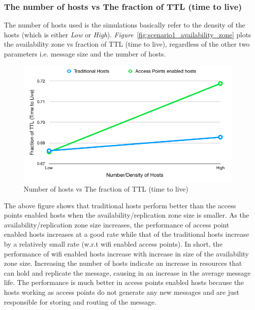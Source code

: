 {\subsubsection{The number of hosts vs The fraction of TTL (time to live)}
The number of hosts used is the simulations basically refer to the density of the hosts (which is either \textit{Low} or \textit{High}). \emph{Figure}~\ref{fig:scenario1_availability_zone} plots the availability zone vs fraction of TTL (time to live), regardless of the other two parameters i.e. message size and the number of hosts.
\begin{figure}[H]
  \centering
  \includegraphics[scale=0.45]{./figures/scenario1_hosts_count}
  \caption{Number of hosts vs The fraction of TTL (time to live)}
  \label{fig:scenario1_number_of_hosts}
\end{figure}
The above figure shows that traditional hosts perform better than the access points enabled hosts when the availability/replication zone size is smaller. As the availability/replication zone size increases, the performance of access point enabled hosts increases at a good rate while that of the traditional hosts increase by a relatively small rate (w.r.t wifi enabled access points). In short, the performance of wifi enabled hosts increase with increase in size of the availability zone size. Increasing the number of hosts indicate an increase in resources that can hold and replicate the message, causing in an increase in the average message life. The performance is much better in access points enabled hosts because the hosts working as access points do not generate any new messages and are just responsible for storing and routing of the message.
}
